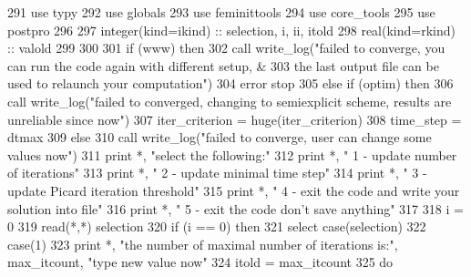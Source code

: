 \begin{DoxyCode}
291       \textcolor{keywordtype}{use }typy
292       \textcolor{keywordtype}{use }globals
293       \textcolor{keywordtype}{use }feminittools
294       \textcolor{keywordtype}{use }core_tools
295       \textcolor{keywordtype}{use }postpro
296       
297       \textcolor{keywordtype}{integer(kind=ikind)} :: selection, i, ii, itold
298       \textcolor{keywordtype}{real(kind=rkind)} :: valold
299     
300       
301       \textcolor{keywordflow}{if} (www) \textcolor{keywordflow}{then}
302         \textcolor{keyword}{call }write_log(\textcolor{stringliteral}{"failed to converge, you can run the code again with different setup, &}
303 \textcolor{stringliteral}{}\textcolor{stringliteral}{        the last output file can be used to relaunch your computation"})
304         error stop
305       \textcolor{keywordflow}{else} \textcolor{keywordflow}{if} (optim) \textcolor{keywordflow}{then}
306         \textcolor{keyword}{call }write_log(\textcolor{stringliteral}{"failed to converged, changing to semiexplicit scheme, results are unreliable since
       now"}\textcolor{comment}{)}
307 \textcolor{comment}{        iter_criterion = huge(iter_criterion)}
308 \textcolor{comment}{        time_step = dtmax}
309 \textcolor{comment}{      }\textcolor{keywordflow}{else}
310         \textcolor{keyword}{call }write_log(\textcolor{stringliteral}{"failed to converge, user can change some values now"})
311         print *, \textcolor{stringliteral}{"select the following:"}
312         print *, \textcolor{stringliteral}{"                     1 - update number of iterations"}
313         print *, \textcolor{stringliteral}{"                     2 - update minimal time step"}
314         print *, \textcolor{stringliteral}{"                     3 - update Picard iteration threshold"}
315         print *, \textcolor{stringliteral}{"                     4 - exit the code and write your solution into file"}
316         print *, \textcolor{stringliteral}{"                     5 - exit the code don't save anything"}
317 
318         i = 0
319         \textcolor{keyword}{read}(*,*) selection
320         \textcolor{keywordflow}{if} (i == 0) \textcolor{keywordflow}{then}
321           \textcolor{keywordflow}{select case}(selection)
322             \textcolor{keywordflow}{case}(1)
323               print *, \textcolor{stringliteral}{"the number of maximal number of iterations is:"}, 
      max_itcount\textcolor{comment}{, }\textcolor{stringliteral}{"type new value now"}
324               itold = max_itcount
325               \textcolor{keywordflow}{do}

\end{DoxyCode}

